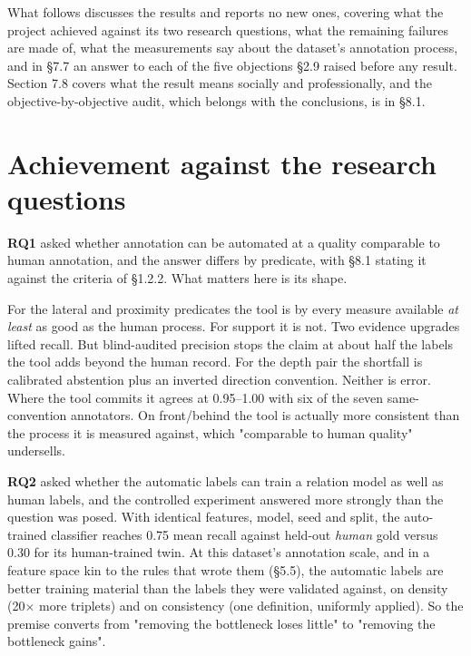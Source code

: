 
What follows discusses the results and reports no new ones, covering what the project achieved against its two research questions, what the remaining failures are made of, what the measurements say about the dataset's annotation process, and in \S{}7.7 an answer to each of the five objections \S{}2.9 raised before any result. Section 7.8 covers what the result means socially and professionally, and the objective-by-objective audit, which belongs with the conclusions, is in \S{}8.1.

\section{Achievement against the research questions}

\textbf{RQ1} asked whether annotation can be automated at a quality comparable to human annotation, and the answer differs by predicate, with \S{}8.1 stating it against the criteria of \S{}1.2.2. What matters here is its shape.

For the lateral and proximity predicates the tool is by every measure available \textit{at least} as good as the human process. For support it is not. Two evidence upgrades lifted recall. But blind-audited precision stops the claim at about half the labels the tool adds beyond the human record. For the depth pair the shortfall is calibrated abstention plus an inverted direction convention. Neither is error. Where the tool commits it agrees at 0.95--1.00 with six of the seven same-convention annotators. On front/behind the tool is actually more consistent than the process it is measured against, which "comparable to human quality" undersells.

\textbf{RQ2} asked whether the automatic labels can train a relation model as well as human labels, and the controlled experiment answered more strongly than the question was posed. With identical features, model, seed and split, the auto-trained classifier reaches 0.75 mean recall against held-out \textit{human} gold versus 0.30 for its human-trained twin. At this dataset's annotation scale, and in a feature space kin to the rules that wrote them (\S{}5.5), the automatic labels are better training material than the labels they were validated against, on density (20$\times$ more triplets) and on consistency (one definition, uniformly applied). So the premise converts from "removing the bottleneck loses little" to "removing the bottleneck gains".

